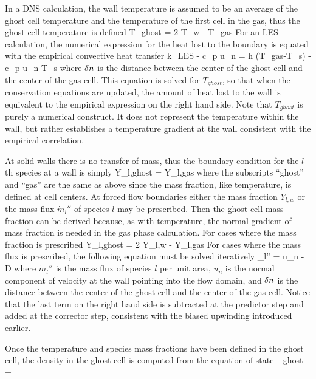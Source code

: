 \documentclass[11pt]{book}
\begin{document}
In a DNS calculation, the wall temperature is assumed to be an average of the
ghost cell temperature and the temperature of the first cell in the gas,
thus the ghost cell temperature is defined
\be T_{ghost} =  2 T_w - T_{gas}  \ee
For an LES calculation, the numerical expression for the heat lost to the boundary is
equated with the empirical convective heat transfer
\be k_{\hbox{\tiny LES}}  - c_p u_n \rho {}
   = h \; (T_{gas}-T_s) - c_p u_n \rho T_s  \ee
where $\delta n$ is the distance between the center of the ghost cell
and the center of the gas cell. This equation is solved for $T_{ghost}$,
so that when the conservation equations are updated, the amount of heat
lost to the wall is equivalent to the empirical expression on the right
hand side. Note that $T_{ghost}$ is purely a numerical construct. It does
not represent the temperature within the wall, but rather establishes
a temperature gradient at the wall consistent with the empirical
correlation.

At solid walls there is no transfer of mass, thus the boundary condition
for the $l$th species at a wall is simply
\be Y_{l,ghost} = Y_{l,gas} \ee
where the subscripts ``ghost'' and ``gas'' are the same as above since
the mass fraction, like temperature, is defined at cell centers.
At forced flow boundaries either the mass fraction $Y_{l,w}$ or
the mass flux $\dot{m}_l''$ of species $l$ may be prescribed.
Then the ghost cell mass fraction can be derived because, as with
temperature, the normal gradient of mass fraction is needed in the gas phase
calculation.
For cases where the mass fraction is prescribed
\be Y_{l,ghost} = 2 Y_{l,w} - Y_{l,gas}  \ee
For cases where the mass flux is prescribed,
the following equation must be solved iteratively
\be {}_l'' = u_n 
  - \rho D 
  \mp {}  \ee
where $\dot{m}_l''$ is the mass flux of species $l$ per unit area,
$u_n$ is the normal component of velocity at the wall pointing into
the flow domain, and $\delta n$ is the distance between the center of the ghost
cell and the center of the gas cell. Notice that the last term on the
right hand side is subtracted at the predictor step and added at the
corrector step, consistent with the biased upwinding introduced earlier.

Once the temperature and species mass fractions have been defined in the
ghost cell, the density in the ghost cell is computed from the equation of
state
\be  \rho_{ghost} =   \ee
\end{document}
